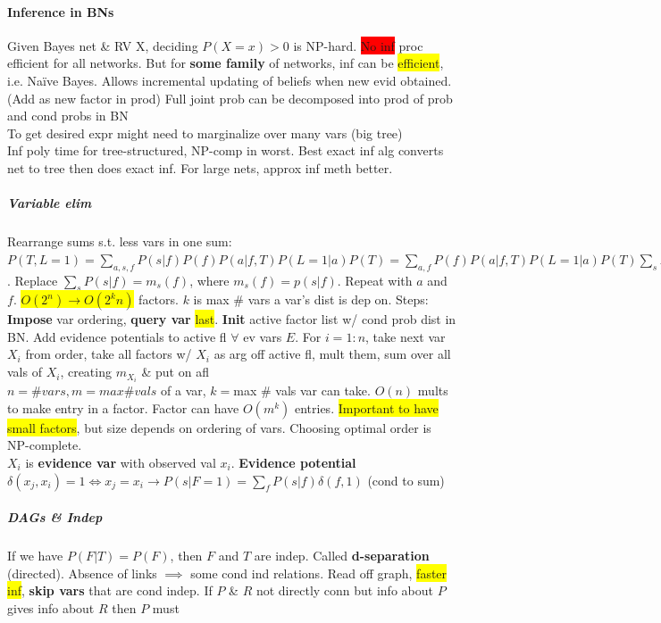 \paragraph{Inference in BNs} Given Bayes net \& RV X, deciding $P(X =
x) >0$ is NP-hard. \colorbox{red}{No inf} proc efficient for all
networks. But for \textbf{some family} of networks, inf can be
\colorbox{yellow}{efficient},
i.e. Na\"ive Bayes. Allows incremental updating of beliefs when new
evid obtained. (Add as new factor in prod)
Full joint prob can be decomposed into prod of prob and cond probs in
BN
\\ To get desired expr might need to marginalize over many vars (big
tree)
\\ Inf poly time for tree-structured, NP-comp in worst. Best exact inf alg
converts net to tree then does exact inf. For large nets, approx inf
meth better.
\subparagraph{Variable elim}
Rearrange sums s.t. less vars in one sum: $P(T, L=1)=\sum_{a,s,f}
P(s|f)P(f)P(a|f,T)P(L=1|a)P(T)=\sum_{a,f}P(f)P(a|f,T)P(L=1|a)P(T)\sum_s
P(s|f)$. Replace $\sum_s P(s|f) = m_s(f)$, where $m_s(f)=p(s|f)$. Repeat with $a$ and
$f$. \colorbox{yellow}{$O(2^n) \to O(2^kn)$} factors. $k$ is max \#
vars a
var's dist is dep on. Steps:
\\ \textbf{Impose} var ordering, \textbf{query var}
\colorbox{yellow}{last}. \textbf{Init} active factor list w/ cond prob
dist in BN. Add evidence potentials to active fl $\forall$ ev vars
$E$. For $i=1:n$, take next var $X_i$ from order, take all factors w/
$X_i$ as arg off active fl, mult them, sum over all vals of $X_i$,
creating $m_{X_i}$ \& put on afl
\\ $n = \# vars, m = max \# vals$ of a var, $k=$max \# vals var can take. $O(n)$ mults to make entry
in a factor. Factor can have $O(m^k)$
entries. \colorbox{yellow}{Important to have small factors}, but size
depends on ordering of vars. Choosing optimal order is NP-complete.
\\ $X_i$ is \textbf{evidence var} with observed val
$x_i$. \textbf{Evidence potential} $\delta(x_j,x_i) = 1 \iff x_j=x_i
\to P(s|F=1)=\sum_f P(s|f)\delta(f,1)$ (cond to sum)
\subparagraph{DAGs \& Indep}
If we have $P(F|T) = P(F)$, then $F$ and $T$ are indep. Called
\textbf{d-separation} (directed). Absence of links $\implies$ some
cond ind relations. Read off graph, \colorbox{yellow}{faster inf},
\textbf{skip vars} that are cond indep. If $P$ \& $R$ not directly
conn but info about $P$ gives info about $R$ then $P$ must
